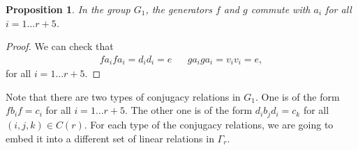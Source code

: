 \documentclass[11pt,letterpaper]{article}
\newcommand{\1}{\mathbb{1}}
\newtheorem{proposition}[theorem]{Proposition}
\theoremstyle{definition}
\begin{document}
\begin{proposition}
	In the group $G_1$, the generators $f$ and $g$ commute with $a_i$ for all $i = 1 \dots r+5$.
\end{proposition}
\begin{proof}
	We can check that
	\begin{align*}
		fa_i f a_i = d_i d_i = e && g a_i g a_i = v_i v_i  = e,
	\end{align*}
	for all $i = 1 \dots r+5$.
\end{proof}
Note that there are two types of conjugacy relations in $G_1$. One is of the form
$f b_i f = c_i$ for all $i = 1 \dots r+5$. The other one is of the form 
$d_ib_jd_i = c_k$ for all $(i,j,k) \in C(r)$. For each type of the conjugacy relations, 
we are going to embed it into a different set of linear relations in $\Gamma_r$.
\end{document}
